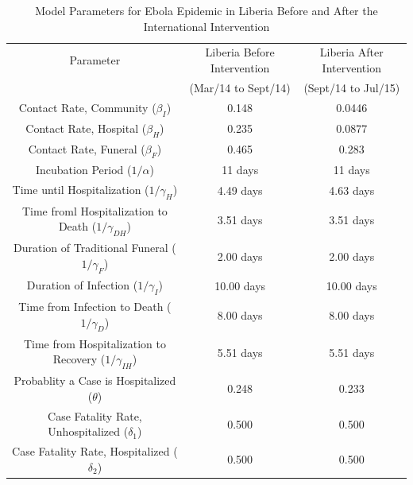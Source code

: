 \documentclass[10pt]{article}
\begin{document}
\begin{table}[ht]
\caption{Model Parameters for Ebola Epidemic in Liberia Before  and After the International Intervention} %
\centering %
\begin{tabular}{c c c } 
\hline\hline %
Parameter & Liberia Before Intervention  & Liberia After Intervention \\ [0.5ex] 
 & (Mar/14 to Sept/14) &  (Sept/14 to Jul/15) \\ [0.5ex] %
\hline %
Contact Rate, Community  ($\beta_{I}$) & 0.148 & 0.0446  \\ 
Contact Rate, Hospital  ($\beta_{H}$) & 0.235 & 0.0877  \\
Contact Rate, Funeral  ($\beta_{F}$) & 0.465 & 0.283 \\
Incubation Period (${1}/{\alpha}$) & 11 days & 11 days  \\
Time until Hospitalization (${1}/{\gamma_{H}}$) & 4.49 days & 4.63 days  \\
Time froml Hospitalization to Death (${1}/{\gamma_{DH}}$) & 3.51 days & 3.51 days  \\ 
Duration of Traditional Funeral (${1}/{\gamma_{F}}$) & 2.00 days & 2.00 days  \\
Duration of Infection (${1}/{\gamma_{I}}$) & 10.00 days & 10.00 days  \\
Time from Infection to Death (${1}/{\gamma_{D}}$) & 8.00 days & 8.00 days  \\
Time from Hospitalization to Recovery (${1}/{\gamma_{IH}}$) & 5.51 days & 5.51 days  \\
Probablity a Case is Hospitalized ($\theta$) & 0.248 & 0.233 \\
Case Fatality Rate, Unhospitalized ($\delta_{1}$) & 0.500  & 0.500  \\
Case Fatality Rate, Hospitalized ($\delta_{2}$) & 0.500 & 0.500 \\ [1ex] 
\hline 
\end{tabular}
\label{tab:parameters}
\end{table}

%
%
% 
%        
%  
%       
%
%
%
%        
%
%
\end{document}
